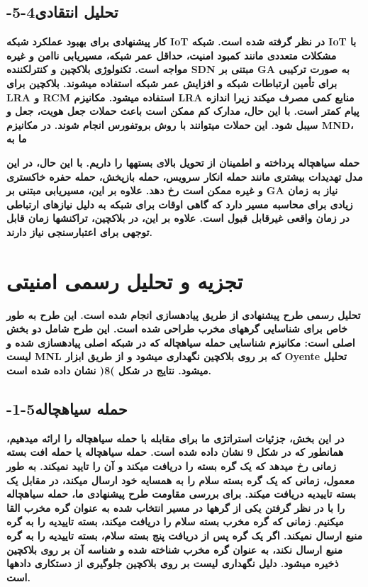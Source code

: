\documentclass{article} %
\begin{document}
\noindent 
\subsection{ -5-4تحلیل انتقادی}

\noindent 
{\bf کار پیشنهادی برای بهبود عملکرد شبکه IoT در نظر گرفته شده است. شبکه IoT با مشکلات متعددی مانند کمبود امنیت، حداقل عمر شبکه، مسیریابی ناامن و غیره مواجه است. تکنولوژی بلاکچین و کنترلکننده SDN مبتنی بر GA به صورت ترکیبی برای تأمین ارتباطات شبکه و افزایش عمر شبکه استفاده میشوند. بلاکچین برای LRA و RCM استفاده میشود. مکانیزم LRA منابع کمی مصرف میکند زیرا اندازه پیام کمتر است. با این حال، مدارک کم ممکن است باعث حملات جعل هویت، جعل و سیبل شود. این حملات میتوانند با روش بروتفورس انجام شوند. در مکانیزم MND، ما به }

\noindent 
{\bf حمله سیاهچاله پرداخته و اطمینان از تحویل بالای بستهها را داریم. با این حال، در این مدل تهدیدات بیشتری مانند حمله انکار سرویس، حمله بازپخش، حمله حفره خاکستری و غیره ممکن است رخ دهد. علاوه بر این، مسیریابی مبتنی بر GA نیاز به زمان زیادی برای محاسبه مسیر دارد که گاهی اوقات برای شبکه به دلیل نیازهای ارتباطی در زمان واقعی غیرقابل قبول است. علاوه بر این، در بلاکچین، تراکنشها زمان قابل توجهی برای اعتبارسنجی نیاز دارند.}


\section{ تجزیه و تحلیل رسمی امنیتی}

\noindent 
{\bf تحلیل رسمی طرح پیشنهادی از طریق پیادهسازی انجام شده است. این طرح به طور خاص برای شناسایی گرههای مخرب طراحی شده است. این طرح شامل دو بخش اصلی است: مکانیزم شناسایی حمله سیاهچاله که در شبکه اصلی پیادهسازی شده و لیست MNL که بر روی بلاکچین نگهداری میشود و از طریق ابزار Oyente تحلیل میشود. نتایج در شکل )8( نشان داده شده است.}

\noindent 
\subsection{ -1-5حمله سیاهچاله}

\noindent 
{\bf در این بخش، جزئیات استراتژی ما برای مقابله با حمله سیاهچاله را ارائه میدهیم، همانطور که در شکل 9 نشان داده شده است. حمله سیاهچاله یا حمله افت بسته زمانی رخ میدهد که یک گره بسته را دریافت میکند و آن را تایید نمیکند. به طور معمول، زمانی که یک گره بسته سلام را به همسایه خود ارسال میکند، در مقابل یک بسته تاییدیه دریافت میکند. برای بررسی مقاومت طرح پیشنهادی ما، حمله سیاهچاله را با در نظر گرفتن یکی از گرهها در مسیر انتخاب شده به عنوان گره مخرب القا میکنیم. زمانی که گره مخرب بسته سلام را دریافت میکند، بسته تاییدیه را به گره منبع ارسال نمیکند. اگر یک گره پس از دریافت پنج بسته سلام، بسته تاییدیه را به گره منبع ارسال نکند، به عنوان گره مخرب شناخته شده و شناسه آن بر روی بلاکچین ذخیره میشود. دلیل نگهداری لیست بر روی بلاکچین جلوگیری از دستکاری دادهها است.}
\end{document}
